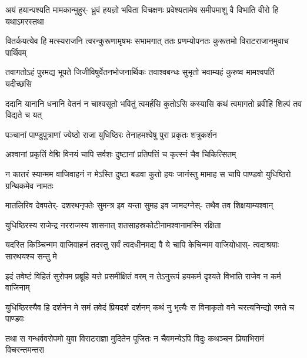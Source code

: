 \fourlineindentedshloka
{अयं हयान्पश्यति मामकान्मुहुर्-}
{ध्रुवं हयज्ञो भविता विचक्षणः}
{प्रवेश्यतामेष समीपमाशु वै}
{विभाति वीरो हि यथाऽमरस्तथा}


\fourlineindentedshloka
{वितर्कयत्येव हि मत्स्यराजनि}
{त्वरन्कुरूणामृषभः सभामगात्}
{ततः प्रणम्योपनतः कुरूत्तमो}
{विराटराजानमुवाच पार्थिवम्}


\fourlineindentedshloka
{तवागतोऽहं पुरमद्य भूपते}
{जिजीविषुर्वेतनभोजनार्थिकः}
{तवाश्वबन्धः सुभृतो भवाम्यहं}
{कुरुष्व मामश्वपतिं यदीच्छसि}




\fourlineindentedshloka
{ददानि यानानि धनानि वेतनं}
{न चाश्वसूतो भवितुं त्वमर्हसि}
{कुतोऽसि कस्यासि कथं त्वमागतो}
{ब्रवीहि शिल्पं तव विद्यते च यत्}




\twolineshloka
{पञ्चानां पाण्डुपुत्राणां ज्येष्ठो राजा युधिष्ठिरः}
{तेनाहमश्वेषु पुरा प्रकृतः शत्रुकर्शन}


\twolineshloka
{अश्वानां प्रकृतिं वेद्मि विनयं चापि सर्वशः}
{दुष्टानां प्रतिपत्तिं च कृत्स्नं चैव चिकित्सितम्}


\fourlineindentedshloka
{न कातरं स्यान्मम वाजिवाहनं}
{न मेऽस्ति दुष्टा बडवा कुतो हयः}
{जानंस्तु मामाह स चापि पाण्डवो}
{युधिष्ठिरो ग्रन्थिकमेव नामतः}


\fourlineindentedshloka
{मातलिरिव देवपतेर्-}
{दशरथनृपतेः सुमन्त्र इव यन्ता}
{सुमह इव जामदग्नेस्-}
{तथैव तव शिक्षयाम्यश्वान्}


\twolineshloka
{युधिष्ठिरस्य राजेन्द्र नरराजस्य शासनात्}
{शतसाहस्रकोटीनामश्वानामस्मि रक्षिता}




\fourlineindentedshloka
{यदस्ति किञ्चिन्मम वाजिवाहनं}
{तदस्तु सर्वं त्वदधीनमद्य वै}
{ये चापि केचिन्मम वाजियोधास्-}
{त्वदाश्रयाः सारथयश्च सन्तु मे}


\fourlineindentedshloka
{इदं तवेष्टं विहितं सुरोपम}
{प्रब्रूहि यत्ते प्रसमीक्षितं वरम्}
{न तेऽनुरूपं हयकर्म दृश्यते}
{विभाति राजेव न कर्म वाजिनाम्}


\fourlineindentedshloka
{युधिष्ठिरस्यैव हि दर्शनेन मे}
{समं तवेदं प्रियदर्श दर्शनम्}
{कथं नु भृत्यैः स विनाकृतो वने}
{चरत्यनिन्द्यो रमते च पाण्डवः}



\fourlineindentedshloka
{तथा स गन्धर्ववरोपमो युवा}
{विराटराज्ञा मुदितेन पूजितः}
{न चैवमन्येऽपि विदुः कथञ्चन}
{प्रियाभिरामं विचरन्तमन्तरा}

